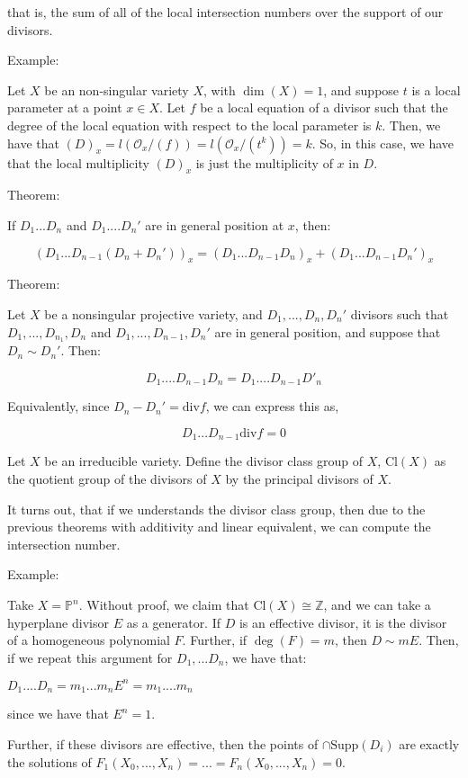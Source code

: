 \documentclass[10pt]{article}
\begin{document}
that is, the sum of all of the local intersection numbers over the support of our divisors.

Example:

Let $X$ be an non-singular variety $X$, with $\dim(X) = 1$, and suppose $t$ is a local parameter at a point $x \in X$. Let $f$ be a local equation of a divisor such that the degree of the local equation with respect to the local parameter is $k$. Then, we have that $(D)_x = l(\mathcal{O}_x/(f)) = l(\mathcal{O}_x/(t^k)) = k$. So, in this case, we have that the local multiplicity $(D)_x$ is just the multiplicity of $x$ in $D$.

Theorem:

If $D_1...D_n$ and $D_1....D_n'$ are in general position at $x$, then:

$$ (D_1...D_{n-1}(D_n + D_n'))_x = (D_1...D_{n-1}D_n)_x + (D_1...D_{n-1}D_n')_x $$

Theorem:

Let $X$ be a nonsingular projective variety, and $D_1,...,D_n,D_n'$ divisors such that $D_1,...,D_{n_1},D_n$ and $D_1,...,D_{n-1},D_n'$ are in general position, and suppose that $D_n \sim D_n'$. Then:

$$ D_1....D_{n-1}D_n = D_1....D_{n-1}D'_n$$

Equivalently, since $D_n - D_n' = \text{div}f$, we can express this as,

$$D_1...D_{n-1}\text{div} f = 0$$

Let $X$ be an irreducible variety. Define the divisor class group of $X$, $\text{Cl}(X)$ as the quotient group of the divisors of $X$ by the principal divisors of $X$.

It turns out, that if we understands the divisor class group, then due to the previous theorems with additivity and linear equivalent, we can compute the intersection number.

Example:

Take $X = \mathbb{P}^n$. Without proof, we claim that $\text{Cl}(X) \cong \mathbb{Z}$, and we can take a hyperplane divisor $E$ as a generator. If $D$ is an effective divisor, it is the divisor of a homogeneous polynomial $F$. Further, if $\deg(F) = m$, then $D \sim mE$. Then, if we repeat this argument for $D_1,...D_n$, we have that:

$D_1....D_n = m_1...m_nE^n = m_1....m_n$

since we have that $E^n = 1$.

Further, if these divisors are effective, then the points of $\cap \text{Supp}(D_i)$ are exactly the solutions of $F_1(X_0,...,X_n) = ... = F_n(X_0,...,X_n) = 0$.
\end{document}
